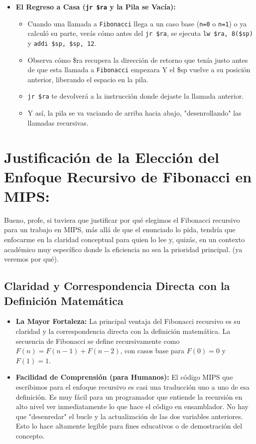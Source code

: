 \documentclass{article}
\begin{document}
\begin{itemize}
\begin{itemize}
        \item Para fib(n-2), sucederá lo mismo.
    \end{itemize}
    \item \textbf{El Regreso a Casa (\texttt{jr \$ra} y la Pila se Vacía):}
    \begin{itemize}
        \item Cuando una llamada a \texttt{Fibonacci} llega a un caso base (\texttt{n=0} o \texttt{n=1}) o ya calculó su parte, verás cómo antes del \texttt{jr \$ra}, se ejecuta \texttt{lw \$ra, 8(\$sp)} y \texttt{addi \$sp, \$sp, 12}.
        \item Observa cómo \$ra recupera la dirección de retorno que tenía justo antes de que esta llamada a \texttt{Fibonacci} empezara Y el \$sp vuelve a su posición anterior, liberando el espacio en la pila.
        \item \texttt{jr \$ra} te devolverá a la instrucción donde dejaste la llamada anterior.
        \item Y así, la pila se va vaciando de arriba hacia abajo, "desenrollando" las llamadas recursivas.
    \end{itemize}
\end{itemize}

\section*{Justificación de la Elección del Enfoque Recursivo de Fibonacci en MIPS:}

Bueno, profe, si tuviera que justificar por qué elegimos el Fibonacci recursivo para un trabajo en MIPS, más allá de que el enunciado lo pida, tendría que enfocarme en la claridad conceptual para quien lo lee y, quizás, en un contexto académico muy específico donde la eficiencia no sea la prioridad principal. (ya veremos por qué).

\subsection*{Claridad y Correspondencia Directa con la Definición Matemática}
\begin{itemize}
    \item \textbf{La Mayor Fortaleza:} La principal ventaja del Fibonacci recursivo es su claridad y la correspondencia directa con la definición matemática. La secuencia de Fibonacci se define recursivamente como $F(n)=F(n-1) + F(n-2)$, con casos base para $F(0)=0$ y $F(1)=1$.
    \item \textbf{Facilidad de Comprensión (para Humanos):} El código MIPS que escribimos para el enfoque recursivo es casi una traducción uno a uno de esa definición. Es muy fácil para un programador que entiende la recursión en alto nivel ver inmediatamente lo que hace el código en ensamblador. No hay que "desenredar" el bucle y la actualización de las dos variables anteriores. Esto lo hace altamente legible para fines educativos o de demostración del concepto.
\end{itemize}
\end{document}

